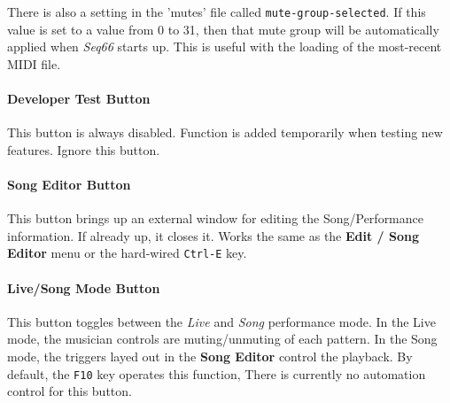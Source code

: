 \documentclass[
 11pt,
 twoside,
 a4paper,
 headinclude,
 footinclude,
 final                                 %
]{article}
\begin{document}
   There is also a setting in the 'mutes' file called
   \texttt{mute-group-selected}.  If this value is set to a value from 0 to 31,
   then that mute group will be automatically applied when
   \textsl{Seq66} starts up.
   This is useful with the loading of the most-recent MIDI file.


\paragraph{Developer Test Button}
\label{paragraph:introduction_developer_test_button}

   This button is always disabled.  Function is added temporarily when testing
   new features. Ignore this button.

\paragraph{Song Editor Button}
\label{paragraph:introduction_song_editor_button}

   This button brings up an external window for editing the Song/Performance
   information.  If already up, it closes it.  Works the same as the
   \textbf{Edit / Song Editor} menu or the hard-wired \texttt{Ctrl-E} key.

\paragraph{Live/Song Mode Button}
\label{paragraph:introduction_livesong_mode_button}

   This button toggles between the \textsl{Live} and \textsl{Song} performance
   mode. In the Live mode, the musician controls are muting/unmuting of each
   pattern.  In the Song mode, the triggers layed out in the
   \textbf{Song Editor} control the playback.
   By default, the \texttt{F10} key operates this function,
   There is currently no automation control for this button.

\begin{comment}
   \itempar{Toggle Tracks}{pattern!toggle tracks}
   \index{pattern!toggle tracks}
   This button changes the status of all of the
   \textsl{playing} tracks, reversing the
   mute status of each pattern that is playing.
   The next click will then unmute only those tracks.
   Because it can be confusing, this button is disabled (not shown
   in the figure) in Song mode.

   LATER:  Describe
   \texttt{Ctrl-M},
   \texttt{Ctrl-U}, and
   \texttt{Ctrl-T}.

\end{comment}
\end{document}

